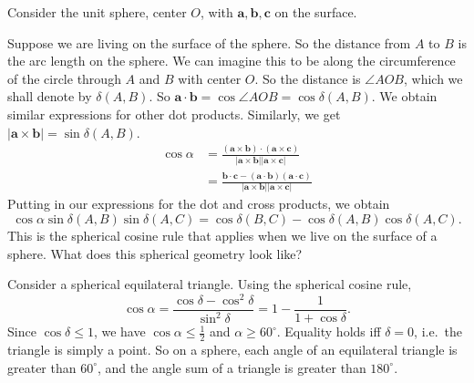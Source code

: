 \documentclass[a4paper]{article}
\begin{document}
Consider the unit sphere, center $O$, with $\mathbf{a, b, c}$ on the surface.
\begin{center}
\end{center}
Suppose we are living on the surface of the sphere. So the distance from $A$ to $B$ is the arc length on the sphere. We can imagine this to be along the circumference of the circle through $A$ and $B$ with center $O$. So the distance is $\angle AOB$, which we shall denote by $\delta (A, B)$. So $\mathbf{a}\cdot \mathbf{b} = \cos \angle AOB = \cos \delta (A, B)$. We obtain similar expressions for other dot products. Similarly, we get $|\mathbf{a}\times \mathbf{b}| = \sin \delta(A, B)$.
\begin{align*}
  \cos \alpha &= \mathbf{\frac{(a\times b)\cdot(a\times c)}{|a\times b||a\times c|}}\\
  &= \mathbf{\frac{b\cdot c - (a\cdot b)(a\cdot c)}{|a\times b||a\times c|}}
\end{align*}
Putting in our expressions for the dot and cross products, we obtain
\[
  \cos\alpha\sin\delta(A, B)\sin\delta(A, C) = \cos\delta(B, C) - \cos\delta(A, B)\cos\delta(A, C).
\]
This is the spherical cosine rule that applies when we live on the surface of a sphere. What does this spherical geometry look like?

Consider a spherical equilateral triangle. Using the spherical cosine rule,
\[
  \cos\alpha = \frac{\cos\delta - \cos^2\delta}{\sin^2\delta} = 1 - \frac{1}{1 + \cos\delta}.
\]
Since $\cos\delta\leq 1$, we have $\cos\alpha\leq \frac{1}{2}$ and $\alpha \geq 60^\circ$. Equality holds iff $\delta = 0$, i.e.\ the triangle is simply a point. So on a sphere, each angle of an equilateral triangle is greater than $60^\circ$, and the angle sum of a triangle is greater than $180^\circ$.
\end{document}
